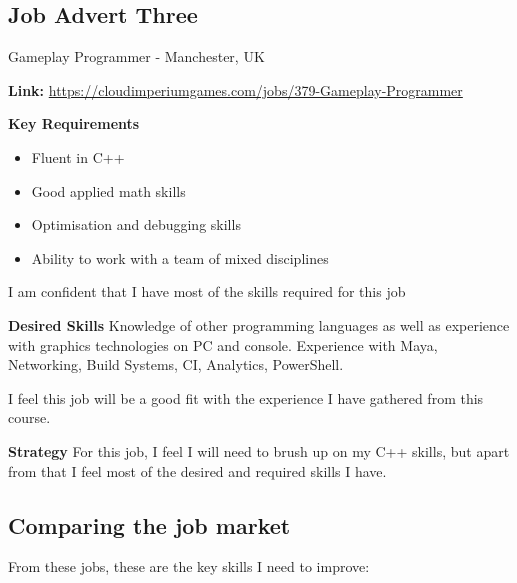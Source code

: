 \documentclass{scrartcl}
\begin{document}
\subsection{Job Advert Three}
Gameplay Programmer -   Manchester, UK \cite{JobThree}

\textbf{Link:}
\url{https://cloudimperiumgames.com/jobs/379-Gameplay-Programmer}


\textbf{Key Requirements}
\begin{itemize}
	\item Fluent in C++
	\item Good applied math skills
	\item Optimisation and debugging skills
	\item Ability to work with a team of mixed disciplines
\end{itemize}
I am confident that I have most of the skills required for this job

\textbf{Desired Skills}
Knowledge of other programming languages as well as experience with graphics technologies on PC and console.
Experience with Maya, Networking, Build Systems, CI, Analytics, PowerShell.

 I feel this job will be a good fit with the experience I have gathered from this course.


\textbf{Strategy}
For this job, I feel I will need to brush up on my C++ skills, but apart from that I feel most of the desired and required skills I have.


\subsection{Comparing the job market}
From these jobs, these are the key skills I need to improve:
\end{document}
